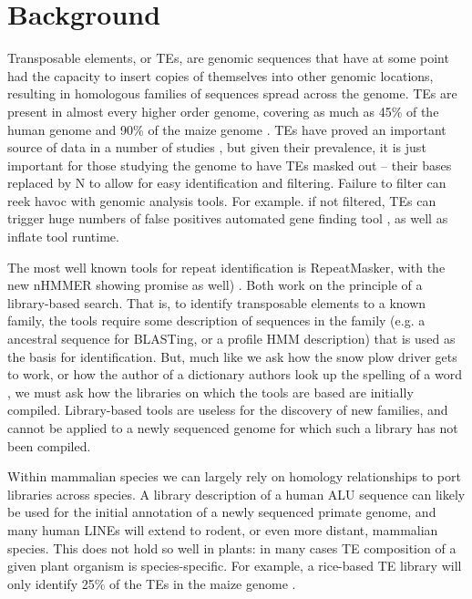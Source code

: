 \documentclass{bmcart}
\begin{document}
\newtheorem{definition}{Definition}
\newtheorem{observation}{Observation}
\newtheorem{lemma}{Lemma}
\newtheorem{theorem}{Theorem}

\section*{Background}
Transposable elements, or TEs, are genomic sequences that have at some
point had the capacity to insert copies of themselves into other
genomic locations, resulting in homologous families of sequences
spread across the genome.  TEs are present in almost every higher
order genome, covering as much as 45\% of the human genome and 90\% of
the maize genome \cite{Venter:2001p92,SanMiguel:1996wa}.  TEs have
proved an important source of data in a number of studies
\cite{Arndt:2005p279,Karro:2008p123,Mugal:2009p581,Hardison:2003p97},
but given their prevalence, it is just important for those studying
the genome to have TEs masked out -- their bases replaced by N to
allow for easy identification and filtering.  Failure to filter can
reek havoc with genomic analysis tools.  For example. if not filtered,
TEs can trigger huge numbers of false positives automated gene finding
tool \cite{Jiang:2013jt}, as well as inflate tool runtime.

The most well known tools for repeat identification is RepeatMasker,
with the new nHMMER showing promise as well)
\cite{RepeatMaskerOpen:XkNxXSd7,Wheeler:2013gj}.  Both work on the
principle of a library-based search.  That is, to identify
transposable elements to a known family, the tools require some
description of sequences in the family (e.g. a ancestral sequence for
BLASTing, or a profile HMM description) that is used as the basis for
identification.  But, much like we ask how the snow plow driver gets
to work, or how the author of a dictionary authors look up the spelling of a word
\cite{Pratchett:uw}, we must ask how the libraries on which the tools
are based are initially compiled.  Library-based tools are useless for the
discovery of new families, and cannot be applied to a newly sequenced
genome for which such a library has not been compiled.


Within mammalian species we can largely rely on homology
relationships to port libraries across species.  A library description
of a human ALU sequence can likely be used for the initial annotation
of a newly sequenced primate genome, and many human LINEs will extend to
rodent, or even more distant, mammalian species.  This does not hold
so well in plants: in many cases TE composition of a given plant organism
is species-specific.  For example, a rice-based TE library will only identify 25\%
of the TEs in the maize genome \cite{Jiang:2013jt}.
\end{document}
